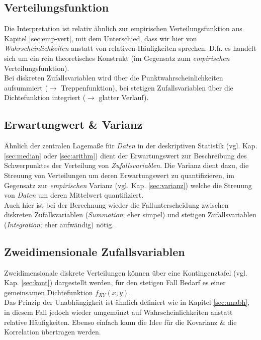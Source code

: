 \documentclass[a4paper]{article}
\newcommand\dangersign[1][2ex]{%
  \renewcommand\stacktype{L}%
  \scaleto{\stackon[1.3pt]{\color{red}$\triangle$}{\tiny !}}{#1}%
}
\begin{document}
\subsection{Verteilungsfunktion}\label{sec:vtlgfkt}

Die Interpretation ist relativ ähnlich zur empirischen Verteilungsfunktion aus Kapitel \ref{sec:emp-vert}, mit dem Unterschied, dass wir hier von \textit{Wahrscheinlichkeiten} anstatt von relativen Häufigkeiten sprechen. D.h. es handelt sich um ein rein theoretisches Konstrukt (im Gegensatz zum \textit{empirischen} Verteilungsfunktion).\\

\noindent \dangersign[3ex] Bei diskreten Zufallsvariablen wird über die Punktwahrscheinlichkeiten aufsummiert ($\rightarrow$ Treppenfunktion), bei stetigen Zufallsvariablen über die Dichtefunktion integriert ($\rightarrow$ glatter Verlauf).

\subsection{Erwartungwert \& Varianz}\label{sec:ex-var}

Ähnlich der zentralen Lagemaße für \textit{Daten} in der deskriptiven Statistik (vgl. Kap. \ref{sec:median} oder \ref{sec:arithm}) dient der Erwartungswert zur Beschreibung des Schwerpunktes der Verteilung von \textit{Zufallsvariablen}. Die Varianz dient dazu, die Streuung von Verteilungen um deren Erwartungswert zu quantifizieren, im Gegensatz zur \textit{empirischen} Varianz (vgl. Kap. \ref{sec:varianz}) welche die Streuung von \textit{Daten} um deren Mittelwert quantifiziert.\\

\noindent \dangersign[3ex] Auch hier ist bei der Berechnung wieder die Fallunterscheidung zwischen diskreten Zufallsvariablen (\textit{Summation}; eher simpel) und stetigen Zufallsvariablen (\textit{Integration}; eher aufwändig) nötig.

\subsection{Zweidimensionale Zufallsvariablen}\label{sec:2zv}

Zweidimensionale diskrete Verteilungen können über eine Kontingenztafel (vgl. Kap. \ref{sec:kont}) dargestellt werden, für den stetigen Fall Bedarf es einer gemeinsamen Dichtefunktion $f_{XY}(x,y)$.\\
Das Prinzip der Unabhängigkeit ist ähnlich definiert wie in Kapitel \ref{sec:unabh}, in diesem Fall jedoch wieder umgemünzt auf Wahrscheinlichkeiten anstatt relative Häufigkeiten. Ebenso einfach kann die Idee für die Kovarianz \& die Korrelation übertragen werden.
\end{document}
